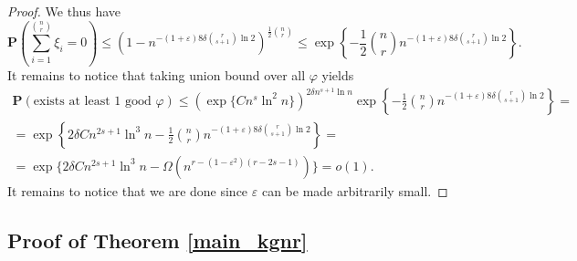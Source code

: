 \documentclass[12pt]{article}
\theoremstyle{remark}
\theoremstyle{definition}
\newcommand{\mP}{\mathbf{P}}
\newcommand{\skob}[1]{\left(#1\right)}
\begin{document}
\begin{proof}
    We thus have
    $$
         \mP\skob{\sum_{i = 1}^{\binom{n}{r}}\xi_i = 0} \leq \skob{1 - n^{-(1+\varepsilon)8\delta\binom{r}{s+1}\ln 2}}^{\frac{1}{2}\binom{n}{r}} \leq \exp\left\{-\frac{1}{2}\binom{n}{r}n^{-(1+\varepsilon)8\delta\binom{r}{s+1}\ln 2}\right\}.
    $$
    It remains to notice that taking union bound over all $\varphi$ yields 
    \begin{multline*}
        \mP(\text{exists at least } 1 \text{ good } \varphi) \leq (\exp\{Cn^s\ln^2 n\})^{2\delta n^{s+1}\ln n}\exp\left\{-\frac{1}{2}\binom{n}{r}n^{-(1+\varepsilon)8\delta\binom{r}{s+1}\ln 2}\right\} = \\ = \exp\left\{2\delta Cn^{2s+1}\ln^3 n - \frac{1}{2}\binom{n}{r}n^{-(1+\varepsilon)8\delta\binom{r}{s+1}\ln 2}\right\} = \\ = \exp\{2\delta Cn^{2s+1}\ln^3 n - \Omega(n^{r-(1-\varepsilon^2)(r-2s-1)})\} = o(1).
    \end{multline*}
    It remains to notice that we are done since $\varepsilon$ can be made arbitrarily small.
\end{proof}

\subsection{Proof of Theorem \ref{main_kgnr}}
\end{document}
